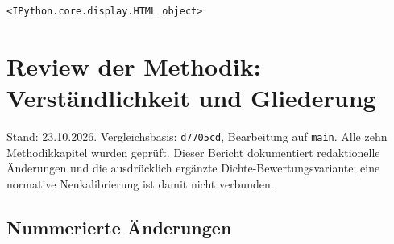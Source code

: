 \documentclass[
  ngerman,
  a4paper,
  DIV=11]{scrreprt}
\begin{document}
\begin{verbatim}
<IPython.core.display.HTML object>
\end{verbatim}

\chapter{Review der Methodik: Verständlichkeit und
Gliederung}\label{sec-review-methodik}

Stand: 23.10.2026. Vergleichsbasis: \texttt{d7705cd}, Bearbeitung auf
\texttt{main}. Alle zehn Methodikkapitel wurden geprüft. Dieser Bericht
dokumentiert redaktionelle Änderungen und die ausdrücklich ergänzte
Dichte-Bewertungsvariante; eine normative Neukalibrierung ist damit
nicht verbunden.

\section{Nummerierte Änderungen}\label{nummerierte-uxe4nderungen}
\end{document}
